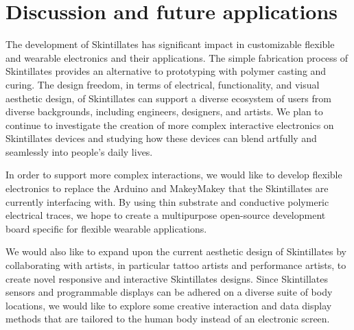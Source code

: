 \documentclass{sigchi}
\begin{document}
\section {Discussion and future applications}
The development of Skintillates has significant impact in customizable flexible and wearable electronics and their applications. The simple fabrication process of Skintillates provides an alternative to prototyping with polymer casting and curing.  The design freedom, in terms of electrical, functionality, and visual aesthetic design, of Skintillates can support a diverse ecosystem of users from diverse backgrounds, including engineers, designers, and artists. We plan to continue to investigate the creation of more complex interactive electronics on Skintillates devices and studying how these devices can blend artfully and seamlessly into people's daily lives. 

In order to support more complex interactions, we would like to develop flexible electronics to replace the Arduino and MakeyMakey that the Skintillates are currently interfacing with. By using thin substrate and conductive polymeric electrical traces, we hope to create a multipurpose open-source development board specific for flexible wearable applications. 

We would also like to expand upon the current aesthetic design of Skintillates by collaborating with artists, in particular tattoo artists and performance artists, to create  novel responsive and interactive Skintillates designs. Since Skintillates sensors and programmable displays can be adhered on a diverse suite of body locations, we would like to explore some creative interaction and data display methods that are tailored to the human body instead of an electronic screen. 
\end{document}
